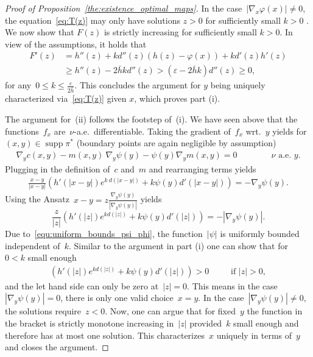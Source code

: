\documentclass[10pt,a4paper]{amsart}
\DeclareMathOperator{\supp}{supp}
\begin{document}
\begin{proof}[Proof of Proposition~\ref{the:existence_optimal_maps}]
In the case~$|\nabla_x \varphi(x)| \neq 0$, the equation~\eqref{eq:T(z)} may only have solutions $z > 0$ for sufficiently small $k >0$ . We  now show that $F(z)$ is strictly increasing for sufficiently small $k >0$. In view of the assumptions, it holds that
\begin{align}
    F'(z) & = h''(z) +  k   d''(z) \left(h(z) - \varphi(x) \right) + k d'(z) h'(z) \\
    & \geq  h''(z) - 2 \bar{h} k d''(z) > (\varepsilon - 2 \bar{h} k) d''(z) \geq 0,
\end{align} 
for any~$0\leq k\leq \frac{\varepsilon}{2 \bar{h}}$.
This concludes the argument for $y$ being uniquely characterized via~\eqref{eq:T(z)} given $x$, which proves part (i).






The argument for~(ii) follows the footstep of~(i). We have seen above that the functions~$f_x$ are~$\nu$-a.e.~differentiable.  Taking the gradient of~$f_x$ wrt.~$y$  yields for~$(x,y) \in \supp \pi^*$ (boundary points are again negligible by assumption)
\begin{align}\label{equ:characteristic_equation_dual_optimal_map}
    \nabla_y c(x,y) - m(x,y) \ \nabla_y \psi (y)   - \psi (y)  \nabla_y  m(x,y) = 0 \qquad \qquad \mbox{$\nu$ a.e.~$y$.}
\end{align}
    Plugging in the definition of~$c$ and~$m$ and rearranging terms yields
    \begin{align}
        \frac{x-y}{|x-y|} \left( h'(|x-y|) e^{k \ d(|x-y|)} + k \psi(y)  d'(|x-y|)  \right) = - \nabla_y \psi(y).
    \end{align}
    Using the Ansatz~$x-y = z \frac{\nabla_y \psi(y)}{|\nabla_y \psi(y)|}$ yields
\[
\frac{z}{|z|}  \left(  h'(|z|  ) e^{k d(|z| )}   + k  \psi (y)    d'(|z|)  \right) = - | \nabla_y \psi(y)|.
\]
    Due to~\eqref{equ:uniform_bounds_psi_phi}, the function~$|\psi|$ is uniformly bounded independent of~$k$. Similar to the argument in part (i) one can show that for~$0<k$ small enough
    \begin{align*}
       \left(  h'(|z|  ) e^{k d(|z| )}   + k  \psi (y)    d'(|z|)  \right) > 0~ \qquad \mbox{ if }  |z| >0,
    \end{align*}
    and the let hand side can only be zero at~$|z|=0$. This means in the case~$| \nabla_y \psi(y)| =0$, there is only one valid choice~$x=y$. In the case~$| \nabla_y \psi(y)| \neq 0$, the solutions require~$z < 0$. Now, one can argue that for fixed~$y$ the function in the bracket is strictly monotone increasing in~$|z|$ provided~$k$ small enough and therefore has at most one solution. This characterizes~$x$ uniquely in terms of~$y$ and closes the argument.  
\end{proof}
\end{document}
